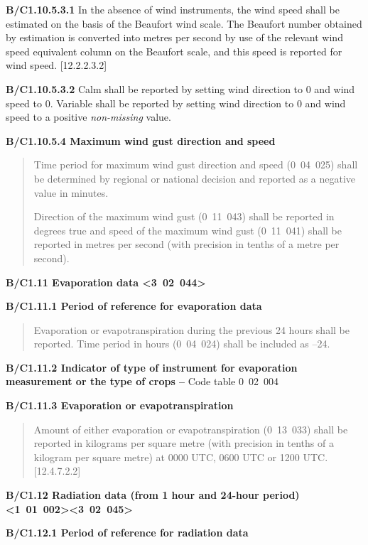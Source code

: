 \textbf{B/C1.10.5.3.1} In the absence of wind instruments, the wind speed shall be estimated on the basis of the Beaufort wind scale. The Beaufort number obtained by estimation is converted into metres per second by use of the relevant wind speed equivalent column on the Beaufort scale, and this speed is reported for wind speed. {[}12.2.2.3.2{]}

\textbf{B/C1.10.5.3.2} Calm shall be reported by setting wind direction to 0 and wind speed to 0. Variable shall be reported by setting wind direction to 0 and wind speed to a positive \emph{non-missing} value.

\textbf{B/C1.10.5.4 Maximum wind gust direction and speed}

\begin{quote}
Time period for maximum wind gust direction and speed (0~04~025) shall be determined by regional or national decision and reported as a negative value in minutes.

Direction of the maximum wind gust (0~11~043) shall be reported in degrees true and speed of the maximum wind gust (0~11~041) shall be reported in metres per second (with precision in tenths of a metre per second).
\end{quote}

\textbf{B/C1.11 Evaporation data \textless3~02~044\textgreater{}}

\textbf{B/C1.11.1 Period of reference for evaporation data}

\begin{quote}
Evaporation or evapotranspiration during the previous 24 hours shall be reported. Time period in hours (0~04~024) shall be included as --24.
\end{quote}

\textbf{B/C1.11.2 Indicator of type of instrument for evaporation measurement or the type of crops --} Code table 0~02~004

\textbf{B/C1.11.3 Evaporation or evapotranspiration}

\begin{quote}
Amount of either evaporation or evapotranspiration (0~13~033) shall be reported in kilograms per square metre (with precision in tenths of a kilogram per square metre) at 0000 UTC, 0600 UTC or 1200 UTC. {[}12.4.7.2.2{]}
\end{quote}

\textbf{B/C1.12 Radiation data (from 1 hour and 24-hour period) \textless1~01~002\textgreater\textless3~02~045\textgreater{}}

\textbf{B/C1.12.1 Period of reference for radiation data}

